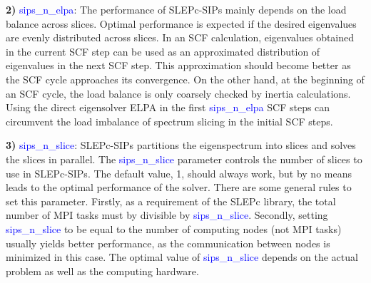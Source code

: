 \documentclass{report}
\newcommand{\tcb}[1]{\textcolor{blue}{#1}}
\begin{document}
\textbf{2)} \tcb{sips\_n\_elpa}: The performance of SLEPc-SIPs mainly depends on the load balance across slices. Optimal performance is expected if the desired eigenvalues are evenly distributed across slices. In an SCF calculation, eigenvalues obtained in the current SCF step can be used as an approximated distribution of eigenvalues in the next SCF step. This approximation should become better as the SCF cycle approaches its convergence. On the other hand, at the beginning of an SCF cycle, the load balance is only coarsely checked by inertia calculations. Using the direct eigensolver ELPA in the first \tcb{sips\_n\_elpa} SCF steps can circumvent the load imbalance of spectrum slicing in the initial SCF steps.

\textbf{3)} \tcb{sips\_n\_slice}: SLEPc-SIPs partitions the eigenspectrum into slices and solves the slices in parallel. The \tcb{sips\_n\_slice} parameter controls the number of slices to use in SLEPc-SIPs. The default value, 1, should always work, but by no means leads to the optimal performance of the solver. There are some general rules to set this parameter. Firstly, as a requirement of the SLEPc library, the total number of MPI tasks must by divisible by \tcb{sips\_n\_slice}. Secondly, setting \tcb{sips\_n\_slice} to be equal to the number of computing nodes (not MPI tasks) usually yields better performance, as the communication between nodes is minimized in this case. The optimal value of \tcb{sips\_n\_slice} depends on the actual problem as well as the computing hardware.
\end{document}
